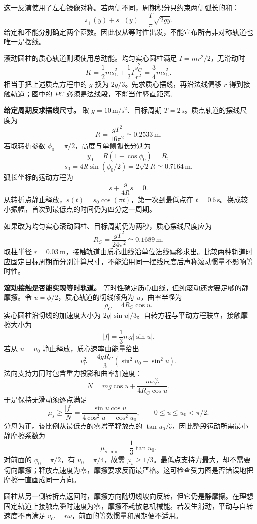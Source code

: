 \documentclass[12pt,a4paper,UTF8]{ctexart}
\begin{document}
这一反演使用了左右镜像对称。若两侧不同，周期积分只约束两侧弧长的和： \[
s_+(y)+s_-(y)=\frac T\pi\sqrt{2gy}.
\]
给定和不能分别确定两个函数。因此仅从等时性出发，不能宣布所有非对称轨道也唯一是摆线。

滚动圆柱的质心轨道则须使用总动能。均匀实心圆柱满足
\(I=mr^2/2\)，无滑动时 \[
K=\frac12m\dot s_C^2+\frac12I\frac{\dot s_C^2}{r^2}
=\frac34m\dot s_C^2.
\] 相当于把上述质点方程中的 \(g\) 换为
\(2g/3\)。先求质心摆线，再沿法线偏移 \(r\) 得到接触轨道；图中的 \(PC\)
必须是法线段，不能当作竖直距离。

\textbf{给定周期反求摆线尺寸。} 取 \(g=10\,\mathrm{m/s^2}\)、目标周期
\(T=2\,\mathrm s\)。质点轨道的摆线尺度为 \[
R=\frac{gT^2}{16\pi^2}\simeq0.2533\,\mathrm m.
\] 若取转折参数 \(\phi_0=\pi/2\)，高度与单侧弧长分别为 \[
y_0=R(1-\cos\phi_0)=R,
\] \[
s_0=4R\sin(\phi_0/2)=2\sqrt2R\simeq0.7164\,\mathrm m.
\] 弧长坐标的运动方程为 \[
\ddot s+\frac g{4R}s=0.
\] 从转折点静止释放，\(s(t)=s_0\cos(\pi t)\)，第一次到最低点在
\(t=0.5\,\mathrm s\)。换成较小振幅，首次到最低点的时间仍为四分之一周期。

如果改为均匀实心滚动圆柱、目标周期仍为两秒，质心摆线尺度应为 \[
R_C=\frac{gT^2}{24\pi^2}\simeq0.1689\,\mathrm m.
\] 取柱半径
\(r=0.03\,\mathrm m\)，接触轨道由质心曲线沿单位法线偏移求出。比较两种轨道时应固定目标周期而分别计算尺寸，不能沿用同一摆线尺度后声称滚动惯量不影响等时性。

\textbf{滚动接触是否能实现等时轨道。}
等时性确定质心曲线，但纯滚动还需要足够的静摩擦。令
\(u=\phi/2\)，质心轨道的切线倾角为 \(u\)，曲率半径为 \[
\rho_C=4R_C\cos u.
\] 实心圆柱沿切线的加速度大小为
\(2g|\sin u|/3\)。自转方程与平动方程联立，接触摩擦大小为 \[
|f|=\frac13mg|\sin u|.
\] 若从 \(u=u_0\) 静止释放，质心速率由能量给出 \[
v_C^2=\frac{4gR_C}{3}(\sin^2u_0-\sin^2u).
\] 法向支持力同时包含重力投影和曲率加速度： \[
N=mg\cos u+\frac{mv_C^2}{4R_C\cos u}.
\] 于是保持无滑动须逐点满足 \[
\mu_s\ge\frac{|f|}{N}
=\frac{\sin u\cos u}{4\cos^2u-\cos^2u_0},\qquad0\le u\le u_0<\pi/2.
\] 分母为正。该比例从最低点的零增至释放点的
\(\tan u_0/3\)，因此整段运动所需最小静摩擦系数为 \[
\mu_{s,\min}=\frac13\tan u_0.
\] 对前面的 \(\phi_0=\pi/2\)，有 \(u_0=\pi/4\)，故需
\(\mu_s\ge1/3\)。最低点支持力最大，却不需要切向摩擦；释放点速度为零，摩擦要求反而最严格。这可检查受力图是否错误地把摩擦一直画成同一方向。

圆柱从另一侧转折点返回时，摩擦方向随切线坡向反转，但它仍是静摩擦。在理想固定轨道上接触点瞬时速度为零，摩擦不耗散总机械能。若发生滑动，平动与自转速度不再满足
\(v_C=r\omega\)，前面的等效惯量和周期便不适用。
\end{document}
